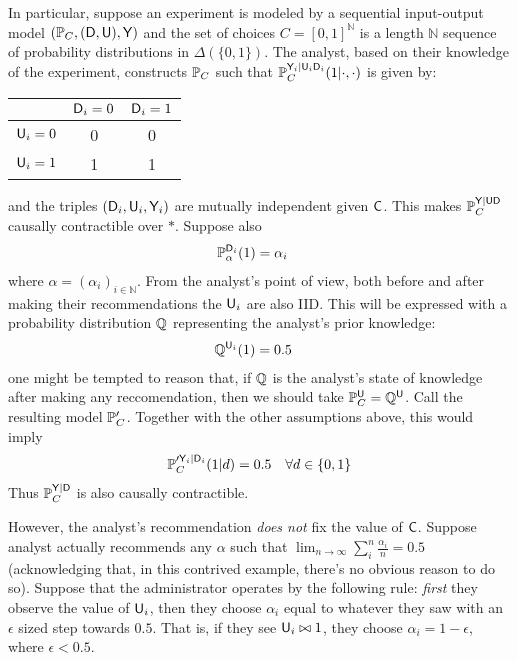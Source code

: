 In particular, suppose an experiment is modeled by a sequential input-output model $(\mathbb{P}_C,(\mathsf{D},\mathsf{U}),\mathsf{Y})$ and the set of choices $C=[0,1]^{\mathbb{N}}$ is a length $\mathbb{N}$ sequence of probability distributions in $\Delta(\{0,1\})$. The analyst, based on their knowledge of the experiment, constructs $\mathbb{P}_C$ such that $\mathbb{P}_C^{\mathsf{Y}_i|\mathsf{U}_i\mathsf{D}_i}(1|\cdot,\cdot)$ is given by:
\begin{center}
\begin{tabular}{ c | c | c }
  & $\mathsf{D}_i=0$ & $\mathsf{D}_i=1$ \\\hline 
 $\mathsf{U}_i=0$ & 0 & 0 \\ \hline 
 $\mathsf{U}_i=1$ & 1 & 1   
\end{tabular}
\end{center}
and the triples $(\mathsf{D}_i,\mathsf{U}_i,\mathsf{Y}_i)$ are mutually independent given $\mathsf{C}$. This makes $\mathbb{P}_C^{\mathsf{Y}|\mathsf{UD}}$ causally contractible over $*$. Suppose also 
\begin{align}
    \mathbb{P}_\alpha^{\mathsf{D}_i}(1) &= \alpha_i
\end{align}
where $\alpha=(\alpha_i)_{i\in\mathbb{N}}$. From the analyst's point of view, both before and after making their recommendations the $\mathsf{U}_i$ are also IID. This will be expressed with a probability distribution $\mathbb{Q}$ representing the analyst's prior knowledge:
\begin{align}
    \mathbb{Q}^{\mathsf{U}_i}(1) &= 0.5
\end{align}
one might be tempted to reason that, if $\mathbb{Q}$ is the analyst's state of knowledge after making any reccomendation, then we should take $\mathbb{P}_C^{\mathsf{U}}=\mathbb{Q}^{\mathsf{U}}$. Call the resulting model $\mathbb{P}_C'$. Together with the other assumptions above, this would imply
\begin{align}
    \mathbb{P}_C^{\prime \mathsf{Y}_i|\mathsf{D}_i}(1|d) &= 0.5 & \forall d\in \{0,1\}
\end{align}
Thus $\mathbb{P}_C^{\mathsf{Y}|\mathsf{D}}$ is also causally contractible.

However, the analyst's recommendation \emph{does not} fix the value of $\mathsf{C}$. Suppose analyst actually recommends any $\alpha$ such that $\lim_{n\to\infty} \sum_i^n \frac{\alpha_i}{n} = 0.5$ (acknowledging that, in this contrived example, there's no obvious reason to do so). Suppose that the administrator operates by the following rule: \emph{first} they observe the value of $\mathsf{U}_i$, then they choose $\alpha_i$ equal to whatever they saw with an $\epsilon$ sized step towards $0.5$. That is, if they see $\mathsf{U}_i\bowtie 1$, they choose $\alpha_i=1-\epsilon$, where $\epsilon < 0.5$.

